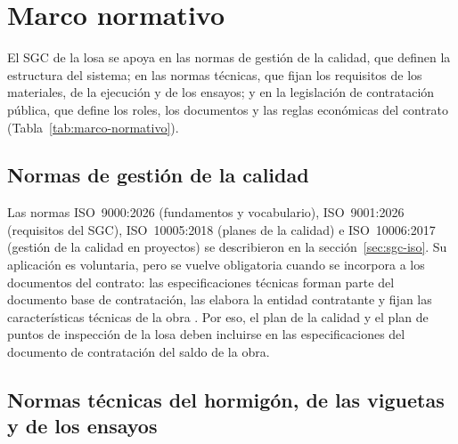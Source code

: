 \vspace{-6pt}
\endgroup

\section{Marco normativo}
\label{sec:marco-normativo}

El SGC de la losa se apoya en las normas de gestión de la calidad, que definen la estructura del sistema; en las normas técnicas, que fijan los requisitos de los materiales, de la ejecución y de los ensayos; y en la legislación de contratación pública, que define los roles, los documentos y las reglas económicas del contrato (Tabla~\ref{tab:marco-normativo}).

\subsection{Normas de gestión de la calidad}

Las normas ISO~9000:2026 (fundamentos y vocabulario), ISO~9001:2026 (requisitos del SGC), ISO~10005:2018 (planes de la calidad) e ISO~10006:2017 (gestión de la calidad en proyectos) se describieron en la sección~\ref{sec:sgc-iso}. Su aplicación es voluntaria, pero se vuelve obligatoria cuando se incorpora a los documentos del contrato: las especificaciones técnicas forman parte del documento base de contratación, las elabora la entidad contratante y fijan las características técnicas de la obra \parencite[art.~5, inc.~m, p.~21]{ds0181_2025compilado}. Por eso, el plan de la calidad y el plan de puntos de inspección de la losa deben incluirse en las especificaciones del documento de contratación del saldo de la obra.

\subsection{Normas técnicas del hormigón, de las viguetas y de los ensayos}

